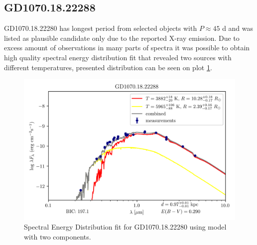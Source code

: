\documentclass{pracalicmgr}
\begin{document}
\subsection{GD1070.18.22288}
GD1070.18.22280 has longest period from selected objects with $P\approx 45$ d and was listed as plausible candidate only due to the reported X-ray emission. Due to excess amount of observations in 
many parts of spectra it was possible to obtain high quality spectral energy distribution fit that revealed two sources with different temperatures, presented distribution can be 
seen on plot \ref{GD1070SED}.
\begin{figure}[H]
    \includegraphics{plots/GD1070.18.22288/GD1070.18.22288_double_emcee.png}
    \caption{Spectral Energy Distribution fit for GD1070.18.22280 using model with two components.}\label{GD1070SED}
\end{figure}
\end{document}
